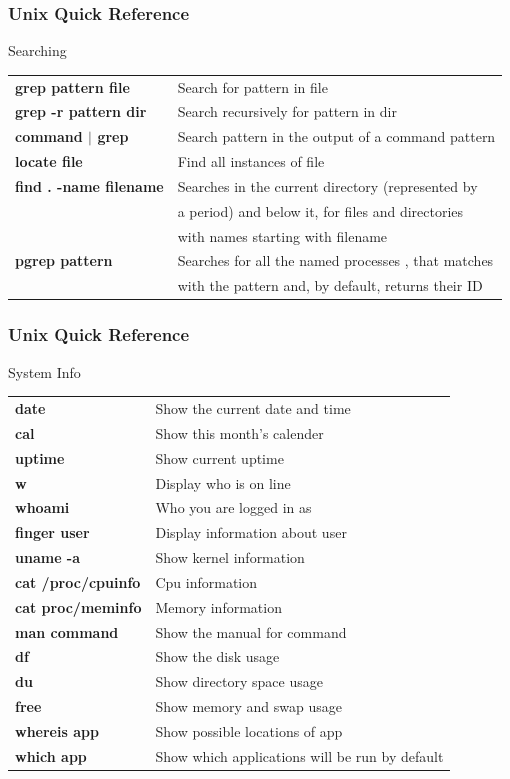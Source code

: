 \documentclass[10pt, hyperref={unicode=true,pdfusetitle, bookmarks=true,bookmarksnumbered=false,bookmarksopen=false, breaklinks=false,pdfborder={0 0l 1},backref=true,colorlinks=true,linkcolor=darkblue,pageanchor}]{beamer}
\begin{document}
\begin{frame}
\frametitle{Unix Quick Reference}
\begin{block}{Searching}

\begin{tabular}{ll}
\textbf{grep pattern file}     & Search for pattern in file                                  \tabularnewline
\textbf{grep -r pattern dir}   & Search recursively for pattern in dir                       \tabularnewline
\textbf{command $|$ grep}        & Search pattern in the output of a command pattern         \tabularnewline
\textbf{locate file}           & Find all instances of file                                  \tabularnewline
\textbf{find . -name filename} & Searches in the current directory (represented by           \tabularnewline
                               & a period) and below it, for files and directories           \tabularnewline
                               & with names starting with filename                           \tabularnewline
\textbf{pgrep pattern}         & Searches for all the named processes , that matches         \tabularnewline
                               & with the pattern and, by default, returns their ID          \tabularnewline
\end{tabular}

\end{block}
\end{frame}
\begin{frame}
\frametitle{Unix Quick Reference}
\begin{block}{System Info}

\begin{tabular}{ll}
\textbf{date}   & Show the current date and time                \tabularnewline
\textbf{cal}    & Show this month's calender                    \tabularnewline
\textbf{uptime} & Show current uptime                           \tabularnewline
\textbf{w}      & Display who is on line                        \tabularnewline
\textbf{whoami} & Who you are logged in as                      \tabularnewline
\textbf{finger user}      & Display information about user                      \tabularnewline
\textbf{uname -a}      & Show kernel information                                \tabularnewline
\textbf{cat /proc/cpuinfo}      & Cpu information                               \tabularnewline
\textbf{cat proc/meminfo}      & Memory information                             \tabularnewline
\textbf{man command}      & Show the manual for command                         \tabularnewline
\textbf{df}      & Show the disk usage                                          \tabularnewline
\textbf{du}      & Show directory space usage                                   \tabularnewline
\textbf{free}      & Show memory and swap usage                                 \tabularnewline
\textbf{whereis app}      & Show possible locations of app                      \tabularnewline
\textbf{which app}      & Show which applications will be run by default        \tabularnewline
\end{tabular}

\end{block}
\end{frame}
\end{document}
